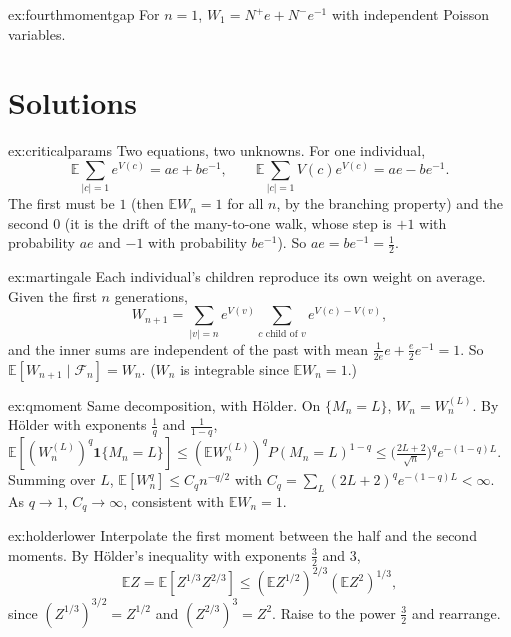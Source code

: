 \begin{hint}{ex:fourthmomentgap}
For $n=1$, $W_1=N^+e+N^-e^{-1}$ with independent Poisson variables.
\end{hint}

\section{Solutions}

\begin{solution}{ex:criticalparams}
\idea Two equations, two unknowns.
\writeup For one individual,
\[
\mathbb E\sum_{|c|=1}e^{V(c)}=ae+be^{-1},\qquad\mathbb E\sum_{|c|=1}V(c)e^{V(c)}=ae-be^{-1}.
\]
The first must be $1$ (then $\mathbb EW_n=1$ for all $n$, by the branching property) and the second $0$ (it is the drift of the many-to-one walk, whose step is $+1$ with probability $ae$ and $-1$ with probability $be^{-1}$). So $ae=be^{-1}=\frac12$.
\end{solution}

\begin{solution}{ex:martingale}
\idea Each individual's children reproduce its own weight on average.
\writeup Given the first $n$ generations,
\[
W_{n+1}=\sum_{|v|=n}e^{V(v)}\sum_{c\text{ child of }v}e^{V(c)-V(v)},
\]
and the inner sums are independent of the past with mean $\frac1{2e}e+\frac e2e^{-1}=1$. So $\mathbb E[W_{n+1}\mid\mathcal F_n]=W_n$. ($W_n$ is integrable since $\mathbb EW_n=1$.)
\end{solution}

\begin{solution}{ex:qmoment}
\idea Same decomposition, with Hölder.
\writeup On $\{M_n=L\}$, $W_n=W_n^{(L)}$. By Hölder with exponents $\frac1q$ and $\frac1{1-q}$, $\mathbb E[(W_n^{(L)})^q\mathbf 1\{M_n=L\}]\le(\mathbb EW_n^{(L)})^qP(M_n=L)^{1-q}\le\bigl(\frac{2L+2}{\sqrt n}\bigr)^qe^{-(1-q)L}$. Summing over $L$, $\mathbb E[W_n^q]\le C_qn^{-q/2}$ with $C_q=\sum_L(2L+2)^qe^{-(1-q)L}<\infty$. As $q\to1$, $C_q\to\infty$, consistent with $\mathbb EW_n=1$.
\end{solution}

\begin{solution}{ex:holderlower}
\idea Interpolate the first moment between the half and the second moments.
\writeup By Hölder's inequality with exponents $\frac32$ and $3$,
\[
\mathbb EZ=\mathbb E[Z^{1/3}Z^{2/3}]\le(\mathbb EZ^{1/2})^{2/3}(\mathbb EZ^2)^{1/3},
\]
since $(Z^{1/3})^{3/2}=Z^{1/2}$ and $(Z^{2/3})^3=Z^2$. Raise to the power $\frac32$ and rearrange.
\end{solution}

